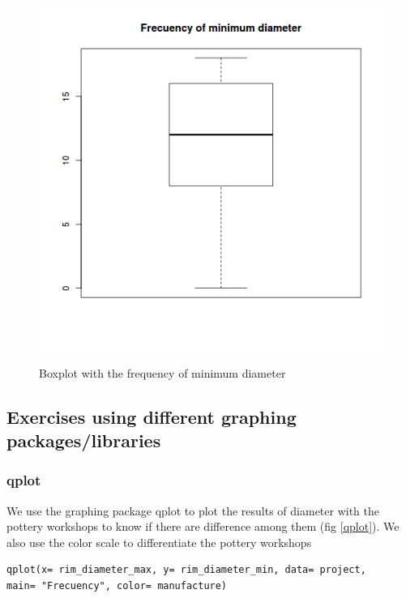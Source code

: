 \documentclass[10pt,a4paper]{article}
\begin{document}
\begin{figure}[hdp]
\centering
\includegraphics[scale=0.30]{boxplotmin.png}
\label{boxmin}
\caption{Boxplot with the frequency of minimum diameter}
\end{figure} 

\subsection{Exercises using different graphing packages/libraries} 


\subsubsection{qplot}

We use the graphing package qplot to plot the results of diameter with the pottery workshops to know if there are difference among them (fig \ref{qplot}). We also use the color scale to differentiate the pottery workshops 

\begin{verbatim}
qplot(x= rim_diameter_max, y= rim_diameter_min, data= project, 
main= "Frecuency", color= manufacture) 
\end{verbatim}
\end{document}

